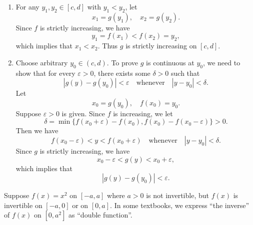 	\begin{proofenv}
		\begin{enumerate}
			\item For any $y_1,y_2\in [c,d]$ with $y_1<y_2$, let
			\[
			x_1=g(y_1),\quad x_2=g(y_2).
			\]
			Since $f$ is strictly increasing, we have
			\[
			y_1=f(x_1)<f(x_2)=y_2,
			\]
			which implies that $x_1<x_2$. Thus $g$ is strictly increasing on $[c,d]$.
			\item Choose arbitrary $y_0\in (c,d)$. To prove $g$ is continuous at $y_0$, we need to show that for every $\varepsilon>0$, there exists some $\delta>0$ such that
			\[
			|g(y)-g(y_0)|<\varepsilon\quad \text{whenever}\quad |y-y_0|<\delta.
			\]
			Let 
			\[
			x_0=g(y_0),\quad f(x_0)=y_0.
			\]
			Suppose $\varepsilon>0$ is given. Since $f$ is increasing, we let \[\delta=\min\{f(x_0+\varepsilon)-f(x_0), f(x_0)-f(x_0-\varepsilon)\}>0.\] Then we have
			\[
			f(x_0 - \varepsilon) < y < f(x_0 + \varepsilon) \quad \text{whenever}\quad |y-y_0|<\delta.
			\]
			Since $g$ is strictly increasing, we have
			\[
			x_0 - \varepsilon < g(y) < x_0 + \varepsilon,
			\]
			which implies that
			\[
			|g(y)-g(y_0)|<\varepsilon.
			\]

		\end{enumerate}
	\end{proofenv}
	\begin{remarkenv}
		Suppose $f(x)=x^2$ on $[-a,a]$ where $a>0$ is not invertible, but $f(x)$ is invertible on $[-a,0]$ or on $[0,a]$. In some textbooks, we express ``the inverse'' of $f(x)$ on $[0,a^2]$ as ``double function''.
	\end{remarkenv}

